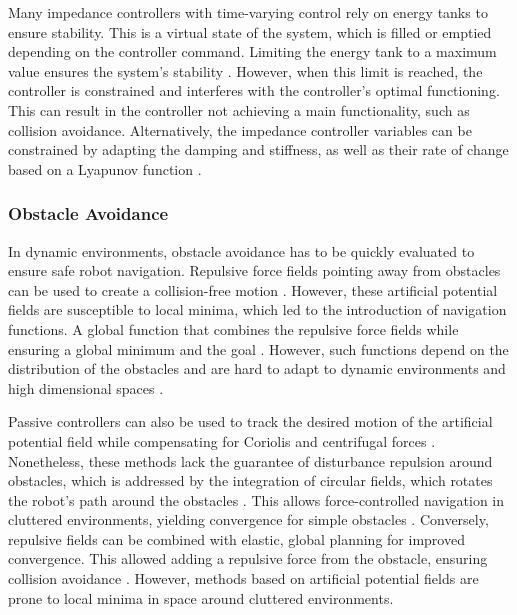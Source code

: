 Many impedance controllers with time-varying control rely on energy tanks to ensure stability. This is a virtual state of the system, which is filled or emptied depending on the controller command. Limiting the energy tank to a maximum value ensures the system's stability  \parencite{ferraguti2013tank}. However, when this limit is reached, the controller is constrained and interferes with the controller's optimal functioning. This can result in the controller not achieving a main functionality, such as collision avoidance.
Alternatively, the impedance controller variables can be constrained by adapting the damping and stiffness, as well as their rate of change based on a Lyapunov function \cite{kronander2016stability}.

\subsubsection{Obstacle Avoidance}
In dynamic environments, obstacle avoidance has to be quickly evaluated to ensure safe robot navigation. Repulsive force fields pointing away from obstacles can be used to create a collision-free motion \parencite{khatib1987unified}. 
However, these artificial potential fields are susceptible to local minima, which led to the introduction of navigation functions. A global function that combines the repulsive force fields while ensuring a global minimum and the goal \parencite{koditschek1990robot}. However, such functions depend on the distribution of the obstacles and are hard to adapt to dynamic environments and high dimensional spaces \parencite{loizou2022mobile}.


Passive controllers can also be used to track the desired motion of the artificial potential field while compensating for Coriolis and centrifugal forces \parencite{duindam2004passive}. 
Nonetheless, these methods lack the guarantee of disturbance repulsion around obstacles, which is addressed by the integration of circular fields, which rotates the robot's path around the obstacles \parencite{singh1996real}. 
This allows force-controlled navigation in cluttered environments, yielding convergence for simple obstacles \parencite{haddadin2011dynamic}. 
Conversely, repulsive fields can be combined with elastic, global planning \parencite{brock2002elastic} for improved convergence. This allowed adding a repulsive force from the obstacle, ensuring collision avoidance \parencite{tulbure2020closing}. 
However, methods based on artificial potential fields are prone to local minima in space around cluttered environments.

